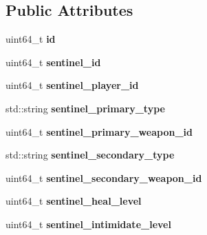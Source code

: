 \subsection*{Public Attributes}
\begin{DoxyCompactItemize}
\item 
\mbox{\label{structmods_1_1orm_1_1sentinel_a29c911a34eeb858460de9d5b8e13f34a}} 
uint64\+\_\+t {\bfseries id}
\item 
\mbox{\label{structmods_1_1orm_1_1sentinel_a546bf0b76824aa6d4c7bcb2b5abf3457}} 
uint64\+\_\+t {\bfseries sentinel\+\_\+id}
\item 
\mbox{\label{structmods_1_1orm_1_1sentinel_a04036fc19d3587d5ff580d50cb33aa20}} 
uint64\+\_\+t {\bfseries sentinel\+\_\+player\+\_\+id}
\item 
\mbox{\label{structmods_1_1orm_1_1sentinel_a741ac3a920ac62edd4f38a95ddd2ecf7}} 
std\+::string {\bfseries sentinel\+\_\+primary\+\_\+type}
\item 
\mbox{\label{structmods_1_1orm_1_1sentinel_abd4a17a67b62887b6b7c336e5809d4e6}} 
uint64\+\_\+t {\bfseries sentinel\+\_\+primary\+\_\+weapon\+\_\+id}
\item 
\mbox{\label{structmods_1_1orm_1_1sentinel_a9e27d4f293b5646563119959663417e5}} 
std\+::string {\bfseries sentinel\+\_\+secondary\+\_\+type}
\item 
\mbox{\label{structmods_1_1orm_1_1sentinel_aeef1e8963c770577ab19741a7210414d}} 
uint64\+\_\+t {\bfseries sentinel\+\_\+secondary\+\_\+weapon\+\_\+id}
\item 
\mbox{\label{structmods_1_1orm_1_1sentinel_a89097297921c4d1a166b699f37ad6e24}} 
uint64\+\_\+t {\bfseries sentinel\+\_\+heal\+\_\+level}
\item 
\mbox{\label{structmods_1_1orm_1_1sentinel_a72b8bc6538fc306debc6ec2890dc998f}} 
uint64\+\_\+t {\bfseries sentinel\+\_\+intimidate\+\_\+level}
\item 

\end{DoxyCompactItemize}
